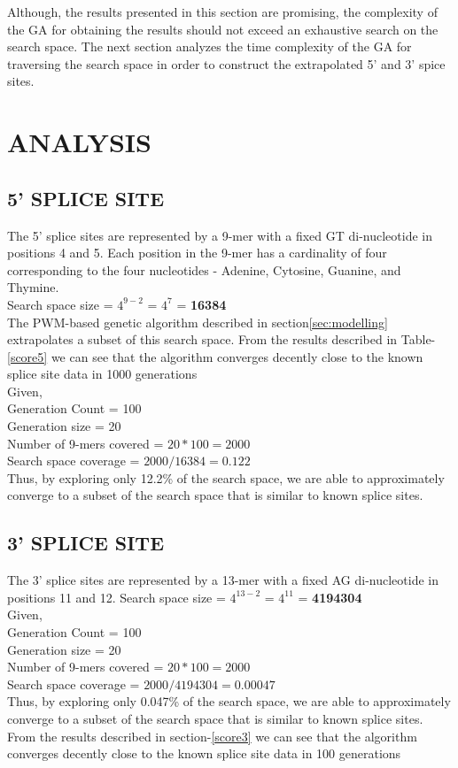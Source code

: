 \documentclass[12pt,a4paper]{article}
\begin{document}
	Although, the results presented in this section are promising, the complexity of the GA for obtaining the results should not exceed an exhaustive search on the search space. The next section analyzes the time complexity of the GA for traversing the search space in order to construct the extrapolated 5' and 3' spice sites. 
	
	\section{ANALYSIS}
	\subsection{5' SPLICE SITE}
	The 5' splice sites are represented by a 9-mer with a fixed GT di-nucleotide in positions 4 and 5. Each position in the 9-mer has a cardinality of four corresponding to the four nucleotides - Adenine, Cytosine, Guanine, and Thymine. \\
	Search space size = $4^{9-2}$ = $4^7$ = \textbf{16384} \\
	The PWM-based genetic algorithm described in section\ref{sec:modelling} extrapolates a subset of this search space. From the results described in Table-\ref{score5} we can see that the algorithm converges decently close to the known splice site data in 1000 generations\\
	Given, \\
	Generation Count = 100 \\
	Generation size = 20 \\
	Number of 9-mers covered = $20 * 100 = 2000 $\\
	Search space coverage = $2000 / 16384 = 0.122$ \\
	Thus, by exploring only 12.2\% of the search space, we are able to approximately converge to a subset of the search space that is similar to known splice sites.

	\subsection{3' SPLICE SITE}
	The 3' splice sites are represented by a 13-mer with a fixed AG di-nucleotide in positions 11 and 12.
	Search space size = $4^{13-2}$ = $4^11$ = \textbf{4194304} \\
	Given, \\
	Generation Count = 100 \\
	Generation size = 20 \\
	Number of 9-mers covered = $20 * 100 = 2000 $\\
	Search space coverage = $2000 / 4194304 = 0.00047$ \\
	Thus, by exploring only 0.047\% of the search space, we are able to approximately converge to a subset of the search space that is similar to known splice sites.
	From the results described in section-\ref{score3} we can see that the algorithm converges decently close to the known splice site data in 100 generations\par
\end{document}
